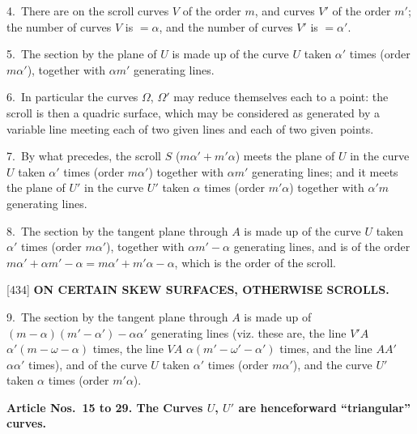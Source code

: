 \documentclass[12pt,a4paper]{article}
\newcommand{\paperref}[1]{\textup{[#1]}}
\theoremstyle{definition}
\begin{document}
4.~There are on the scroll curves $V$ of the order $m$, and curves $V'$ of the order $m'$; the number of curves $V$ is $= \alpha$, and the number of curves $V'$ is $= \alpha'$.

5.~The section by the plane of $U$ is made up of the curve $U$ taken $\alpha'$ times (order $m\alpha'$), together with $\alpha m'$ generating lines.

6.~In particular the curves $\Omega$, $\Omega'$ may reduce themselves each to a point: the scroll is then a quadric surface, which may be considered as generated by a variable line meeting each of two given lines and each of two given points.

7.~By what precedes, the scroll $S$ ($m\alpha' + m'\alpha$) meets the plane of $U$ in the curve $U$ taken $\alpha'$ times (order $m\alpha'$) together with $\alpha m'$ generating lines; and it meets the plane of $U'$ in the curve $U'$ taken $\alpha$ times (order $m'\alpha$) together with $\alpha' m$ generating lines.

8.~The section by the tangent plane through $A$ is made up of the curve $U$ taken $\alpha'$ times (order $m\alpha'$), together with $\alpha m' - \alpha$ generating lines, and is of the order $m\alpha' + \alpha m' - \alpha = m\alpha' + m'\alpha - \alpha$, which is the order of the scroll.

\newpage
\setcounter{page}{60}

\noindent\paperref{434}\quad
\textbf{ON CERTAIN SKEW SURFACES, OTHERWISE SCROLLS.}

9.~The section by the tangent plane through $A$ is made up of $(m - \alpha)(m' - \alpha') - \alpha\alpha'$ generating lines (viz. these are, the line $V'\!A$ $\alpha'(m - \omega - \alpha)$ times, the line $V\!A$ $\alpha(m' - \omega' - \alpha')$ times, and the line $AA'$ $\alpha\alpha'$ times), and of the curve $U$ taken $\alpha'$ times (order $m\alpha'$), and the curve $U'$ taken $\alpha$ times (order $m'\alpha$).

\bigskip
\textbf{Article Nos.~15 to 29. The Curves $U$, $U'$ are henceforward ``triangular'' curves.}
\end{document}
